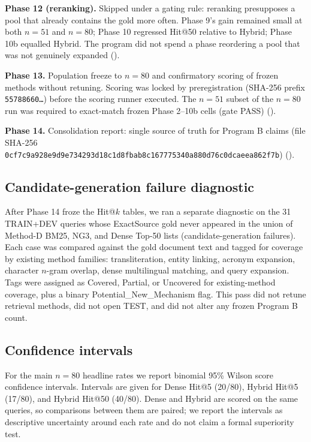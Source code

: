 \documentclass[10pt,letterpaper]{article}
\begin{document}
\textbf{Phase 12 (reranking).} Skipped under a gating rule: reranking presupposes a pool that already contains the gold more often. Phase 9's gain remained small at both $n = 51$ and $n = 80$; Phase 10 regressed Hit@50 relative to Hybrid; Phase 10b equalled Hybrid. The program did not spend a phase reordering a pool that was not genuinely expanded ().

\textbf{Phase 13.} Population freeze to $n = 80$ and confirmatory scoring of frozen methods without retuning. Scoring was locked by preregistration (SHA-256 prefix \texttt{55788660\ldots}) before the scoring runner executed. The $n = 51$ subset of the $n = 80$ run was required to exact-match frozen Phase 2--10b cells (gate PASS) ().

\textbf{Phase 14.} Consolidation report: single source of truth for Program B claims (file SHA-256 \texttt{0cf7c9a928e9d9e734293d18c1d8fbab8c167775340a880d76c0dcaeea862f7b}) ().

\subsection*{Candidate-generation failure diagnostic}

After Phase 14 froze the Hit@$k$ tables, we ran a separate diagnostic on the 31 TRAIN+DEV queries whose ExactSource gold never appeared in the union of Method-D BM25, NG3, and Dense Top-50 lists (candidate-generation failures). Each case was compared against the gold document text and tagged for coverage by existing method families: transliteration, entity linking, acronym expansion, character $n$-gram overlap, dense multilingual matching, and query expansion. Tags were assigned as Covered, Partial, or Uncovered for existing-method coverage, plus a binary Potential\_New\_Mechanism flag. This pass did not retune retrieval methods, did not open TEST, and did not alter any frozen Program B count.

\subsection*{Confidence intervals}

For the main $n = 80$ headline rates we report binomial 95\% Wilson score confidence intervals. Intervals are given for Dense Hit@5 (20/80), Hybrid Hit@5 (17/80), and Hybrid Hit@50 (40/80). Dense and Hybrid are scored on the same queries, so comparisons between them are paired; we report the intervals as descriptive uncertainty around each rate and do not claim a formal superiority test.
\end{document}
